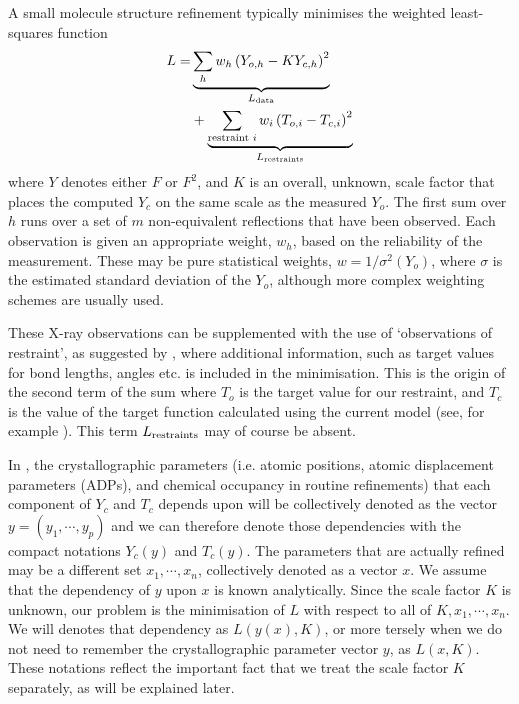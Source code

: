 \documentclass[pdf]{iucr}
\begin{document}
A small molecule structure refinement typically minimises the weighted least-squares function
\begin{equation}
\begin{split}
L = &\underbrace{\sum_h w_h \left( Y_{o,h} - K Y_{c,h} \right)^2}_{L_{\text{data}}} \\
  &+ \underbrace{\sum_{\text{restraint } i} w_i \left( T_{o,i} - T_{c,i} \right)^2}_{L_{\text{restraints}}}
\label{eqn:L:def}
\end{split}
\end{equation}
where $Y$ denotes either $F$ or $F^2$, and $K$ is an overall, unknown, scale factor that places the computed $Y_c$ on the same scale as the measured $Y_o$. The first sum over $h$ runs over a set of $m$ non-equivalent reflections that have been observed. Each observation is given an appropriate weight, $w_h$, based on the reliability of the measurement. These may be pure statistical weights, $w = 1/\sigma^2(Y_o)$, where $\sigma$ is the estimated standard deviation of the $Y_o$, although more complex weighting schemes are usually used.

These X-ray observations can be supplemented with the use of `observations of restraint', as suggested by \cite{Waser:1963aa}, where additional information, such as target values for bond lengths, angles etc. is included in the minimisation. This is the origin of the second term of the sum where $T_o$ is the target value for our restraint, and $T_c$ is the value of the target function calculated using the current model (see, for example \cite{Giacovazzo:2002aa,Watkin:2008aa}). This term $L_{\text{restraints}}$ may of course be absent.

In , the crystallographic parameters (i.e. atomic positions, atomic displacement parameters (ADPs), and chemical occupancy in routine refinements) that each component of $Y_c$ and $T_c$ depends upon will be collectively denoted as the vector $y=(y_1, \cdots, y_p)$ and we can therefore denote those dependencies with the compact notations $Y_c(y)$ and $T_c(y)$. The parameters that are actually refined may be a different set $x_1, \cdots, x_n$, collectively denoted as a vector $x$. We assume that the dependency of $y$ upon $x$ is known analytically. Since the scale factor $K$ is unknown, our problem is the minimisation of $L$ with respect to all of $K, x_1, \cdots, x_n$. We will  denotes that dependency as $L(y(x), K)$, or more tersely when we do not need to remember the crystallographic parameter vector $y$, as $L(x, K)$. These notations reflect the important fact that we treat the scale factor $K$ separately, as will be explained later.
\end{document}
